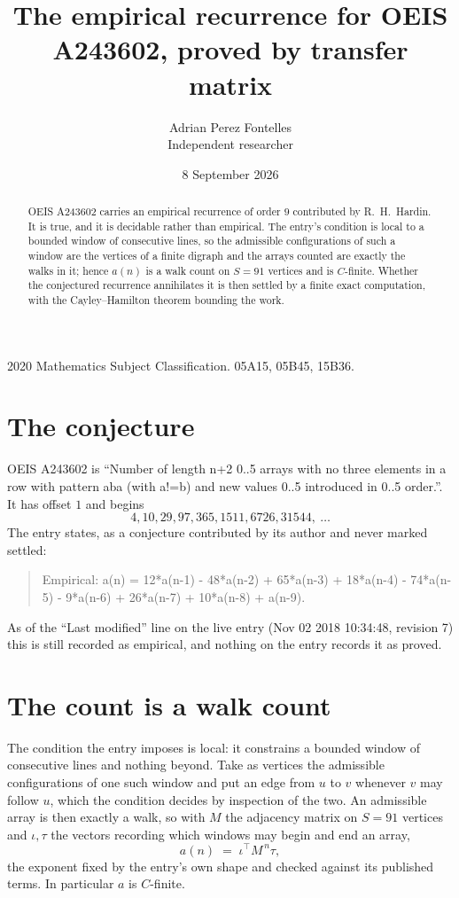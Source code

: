 \documentclass[11pt,a4paper]{article}
\title{The empirical recurrence for OEIS A243602, proved by transfer matrix}
\author{Adrian Perez Fontelles\\ \small Independent researcher}
\date{8 September 2026}
\theoremstyle{plain}
\theoremstyle{definition}
\begin{document}
\maketitle

\begin{abstract}
OEIS A243602 carries an empirical recurrence of order $9$ contributed by R.~H.~Hardin. It is
true, and it is decidable rather than empirical. The entry's condition is local to a bounded window of consecutive lines, so
the admissible configurations of such a window are the vertices of a finite digraph and the
arrays counted are exactly the walks in it; hence $a(n)$ is a walk count on $S=91$ vertices
and is $C$-finite. Whether the conjectured recurrence annihilates it is then settled by a
finite exact computation, with the Cayley--Hamilton theorem bounding the work.
\end{abstract}

\noindent\small 2020 Mathematics Subject Classification. 05A15, 05B45, 15B36.\normalsize

\section{The conjecture}

OEIS A243602 is ``Number of length n+2 0..5 arrays with no three elements in a row with pattern aba (with a!=b) and new values 0..5 introduced in 0..5 order.''. It has offset $1$ and begins
\[
4, 10, 29, 97, 365, 1511, 6726, 31544,\ \dots
\]
The entry states, as a conjecture contributed by its author and never marked settled:
\begin{quote}
Empirical: a(n) = 12*a(n-1) - 48*a(n-2) + 65*a(n-3) + 18*a(n-4) - 74*a(n-5) - 9*a(n-6) + 26*a(n-7) + 10*a(n-8) + a(n-9).
\end{quote}
As of the ``Last modified'' line on the live entry (Nov 02 2018 10:34:48, revision 7) this is still
recorded as empirical, and nothing on the entry records it as proved.

\section{The count is a walk count}

The condition the entry imposes is local: it constrains a bounded window of consecutive lines and nothing beyond. Take as
vertices the admissible configurations of one such window and put an edge from $u$ to $v$
whenever $v$ may follow $u$, which the condition decides by inspection of the two. An
admissible array is then exactly a walk, so with $M$ the adjacency matrix on $S=91$ vertices
and $\iota,\tau$ the vectors recording which windows may begin and end an array,
\[
a(n)\;=\;\iota^{\!\top}M^{\,n}\tau ,
\]
the exponent fixed by the entry's own shape and checked against its published terms. In
particular $a$ is $C$-finite.
\end{document}
